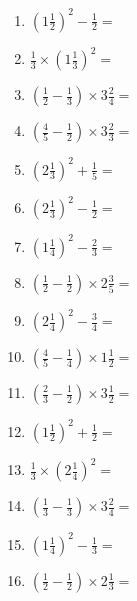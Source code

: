 \documentclass[12pt]{article}
\begin{document}
\begin{enumerate}
\item \large $ \left( 1 \frac{1}{2} \right)^2 - \frac{1}{2} = $ \vspace{1.6cm}
\item \large $ \frac{1}{3} \times \left( 1 \frac{1}{3} \right)^2 = $ \vspace{1.6cm}
\item \large $ \left( \frac{1}{2} - \frac{1}{3} \right) \times 3 \frac{2}{4} = $ \vspace{1.6cm}
\item \large $ \left( \frac{4}{5} - \frac{1}{2} \right) \times 3 \frac{2}{3} = $ \vspace{1.6cm}
\item \large $ \left( 2 \frac{1}{3} \right)^2 + \frac{1}{5} = $ \vspace{1.6cm}
\newpage
\item \large $ \left( 2 \frac{1}{3} \right)^2 - \frac{1}{2} = $ \vspace{1.6cm}
\item \large $ \left( 1 \frac{1}{4} \right)^2 - \frac{2}{3} = $ \vspace{1.6cm}
\item \large $ \left( \frac{1}{2} - \frac{1}{2} \right) \times 2 \frac{3}{5} = $ \vspace{1.6cm}
\item \large $ \left( 2 \frac{1}{4} \right)^2 - \frac{3}{4} = $ \vspace{1.6cm}
\item \large $ \left( \frac{4}{5} - \frac{1}{4} \right) \times 1 \frac{1}{2} = $ \vspace{1.6cm}
\item \large $ \left( \frac{2}{3} - \frac{1}{2} \right) \times 3 \frac{1}{2} = $ \vspace{1.6cm}
\item \large $ \left( 1 \frac{1}{2} \right)^2 + \frac{1}{2} = $ \vspace{1.6cm}
\item \large $ \frac{1}{3} \times \left( 2 \frac{1}{4} \right)^2 = $ \vspace{1.6cm}
\item \large $ \left( \frac{1}{3} - \frac{1}{3} \right) \times 3 \frac{2}{4} = $ \vspace{1.6cm}
\item \large $ \left( 1 \frac{1}{4} \right)^2 - \frac{1}{3} = $ \vspace{1.6cm}
\newpage
\item \large $ \left( \frac{1}{2} - \frac{1}{2} \right) \times 2 \frac{1}{3} = $ \vspace{1.6cm}

\end{enumerate}
\end{document}
